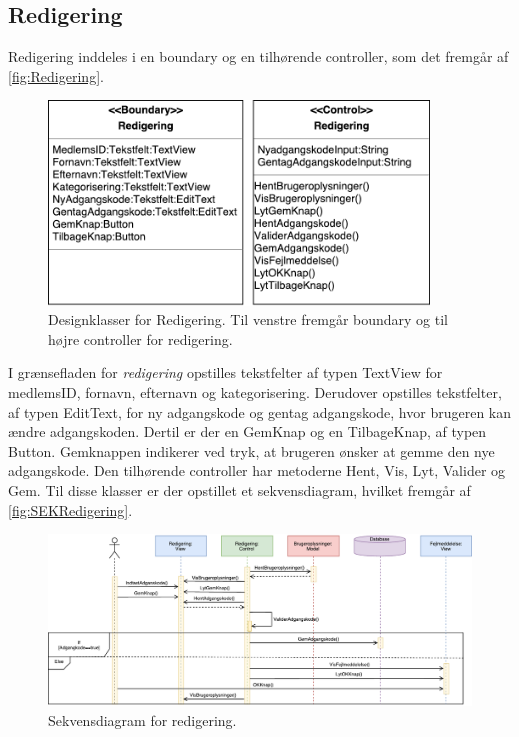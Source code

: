 \subsection*{Redigering}
Redigering inddeles i en boundary og en tilhørende controller, som det fremgår af \autoref{fig:Redigering}. 

\begin{figure} [H]
\centering
\includegraphics[width=0.9\textwidth]{figures/MVC/Redigering}
\caption{Designklasser for Redigering. Til venstre fremgår boundary og til højre controller for redigering.}
\label{fig:Redigering}
\end{figure}

\noindent
I grænsefladen for \textit{redigering} opstilles tekstfelter af typen TextView for medlemsID, fornavn, efternavn og kategorisering. Derudover opstilles tekstfelter, af typen EditText, for ny adgangskode og gentag adgangskode, hvor brugeren kan ændre adgangskoden. Dertil er der en GemKnap og en TilbageKnap, af typen Button. Gemknappen indikerer ved tryk, at brugeren ønsker at gemme den nye adgangskode. 
Den tilhørende controller har metoderne Hent, Vis, Lyt, Valider og Gem. Til disse klasser er der opstillet et sekvensdiagram, hvilket fremgår af \autoref{fig:SEKRedigering}.


\begin{figure} [H]
\centering
\includegraphics[width=1.4\textwidth, angle=90]{figures/Sek/SEKRedigering}
\caption{Sekvensdiagram for redigering.}
\label{fig:SEKRedigering}
\end{figure}

